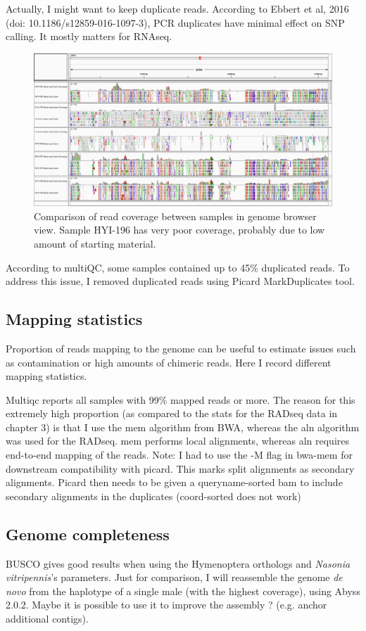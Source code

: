\documentclass[10pt,a4paper]{report}
\begin{document}
Actually, I might want to keep duplicate reads. According to Ebbert et al, 2016 (doi: 10.1186/s12859-016-1097-3), PCR duplicates have minimal effect on SNP calling. It mostly matters for RNAseq.

\begin{figure}
\includegraphics[width=\textwidth]{nucleo_div_wgs/qc/sample_comp.png}
\caption{Comparison of read coverage between samples in genome browser view. Sample HYI-196 has very poor coverage, probably due to low amount of starting material.}
\label{PCR_dup}
\end{figure}

According to multiQC, some samples contained up to 45\% duplicated reads. To address this issue, I removed duplicated reads using Picard MarkDuplicates tool.

\subsection{Mapping statistics}
Proportion of reads mapping to the genome can be useful to estimate issues such as contamination or high amounts of chimeric reads. Here I record different mapping statistics.

Multiqc reports all samples with 99\% mapped reads or more. The reason for this extremely high proportion (as compared to the stats for the RADseq data in chapter 3) is that I use the mem algorithm from BWA, whereas the aln algorithm was used for the RADseq. mem performs local alignments, whereas aln requires end-to-end mapping of the reads.
Note: I had to use the -M flag in bwa-mem for downstream compatibility with picard. This marks split alignments as secondary alignments. Picard then needs to be given a queryname-sorted bam to include secondary alignments in the duplicates (coord-sorted does not work)

\subsection{Genome completeness}
BUSCO gives good results when using the Hymenoptera orthologs and \textit{Nasonia vitripennis}'s parameters. Just for comparison, I will reassemble the genome \textit{de novo} from the haplotype of a single male (with the highest coverage), using Abyss 2.0.2. Maybe it is possible to use it to improve the assembly ? (e.g. anchor additional contigs).
\end{document}
